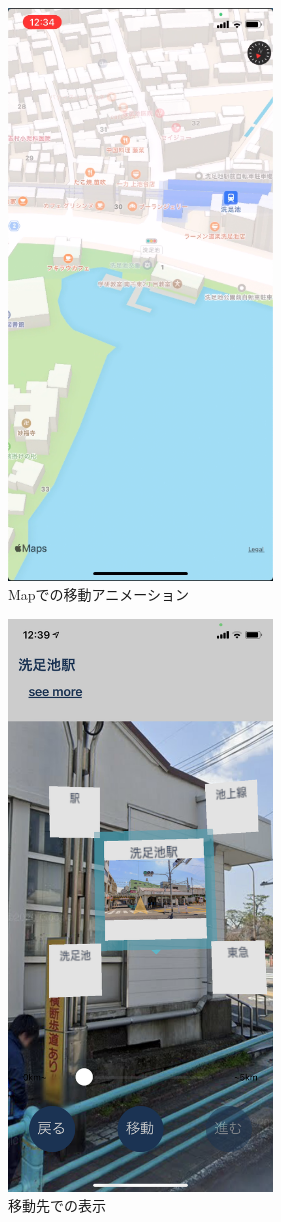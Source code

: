\begin{figure}[h]
\begin{minipage}{0.5\hsize}
    \centering
    \includegraphics[width=70mm]{images/hypar_touch_move_map.png}
    \caption{Mapでの移動アニメーション} \label{fig:hypar_touch_move_map}
  \end{minipage}
\end{figure}

\begin{figure}[h]
  \centering
  \includegraphics[width=70mm]{images/hypar_touch_moved.png}
  \caption{移動先での表示} \label{fig:hypar_touch_moved}
\end{figure}

